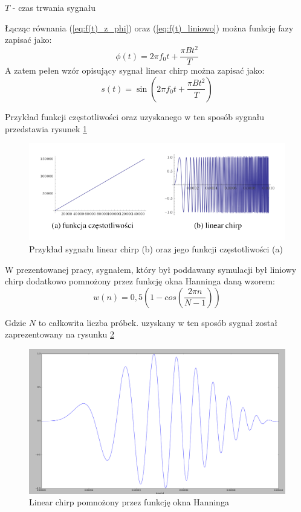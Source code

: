 	$T$ - czas trwania sygnału
	
	Łącząc równania (\ref{eq:f(t)_z_phi}) oraz (\ref{eq:f(t)_liniowo}) można funkcję fazy zapisać jako:
	\begin{equation}
	\phi (t) = 2\pi f_0t+\frac{\pi Bt^2}{T} \label{eq:phi(t)}
	\end{equation}
	A zatem pełen wzór opisujący sygnał linear chirp można zapisać jako:
	\begin{equation}
	s(t) = \sin(2\pi f_0t+\frac{\pi Bt^2}{T})
	\end{equation}
	
	Przykład funkcji częstotliwości oraz uzyskanego w ten sposób sygnału przedstawia rysunek \ref{fig:linear_chirp}
\begin{figure}[h]
\centering
\includegraphics[width=14cm]{Zdjecia/4/linear_chirp}
\caption{Przykład sygnału linear chirp (b) oraz jego funkcji częstotliwości (a)}
\label{fig:linear_chirp}
\end{figure}

W prezentowanej pracy, sygnałem, który był poddawany symulacji był liniowy chirp dodatkowo pomnożony przez funkcję okna Hanninga daną wzorem:
\begin{equation}
w(n)=0,5(1-cos(\frac{2\pi n}{N-1})) \label{eq:okno_hanninga}
\end{equation}

Gdzie $N$ to całkowita liczba próbek. uzyskany w ten sposób sygnał został zaprezentowany na rysunku \ref{fig:test_chirp}
\begin{figure}[h]
\centering
\includegraphics[width=14cm]{Zdjecia/4/test_chirp}
\caption{Linear chirp pomnożony przez funkcję okna Hanninga}
\label{fig:test_chirp}
\end{figure}

